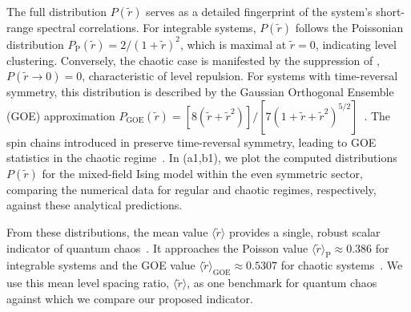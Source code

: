 \documentclass[letterpaper,superscriptaddress,aps,pra,nolongbibliography,showpacs,floatfix,dvipsnames,10pt,twocolumn]{revtex4-2}
\begin{document}
The full distribution $P(\tilde{r})$ serves as a detailed
fingerprint of the system's short-range spectral correlations.
For integrable systems, $P(\tilde{r})$ follows the Poissonian
distribution $P_{\text{P}}(\tilde{r}) = 2 / (1 + \tilde{r})^2$,
which is maximal at $\tilde{r}=0$, indicating level clustering.
Conversely, the chaotic case is manifested by the suppression of ,
$P(\tilde{r} \to 0) = 0$, characteristic of level
repulsion. For systems with time-reversal symmetry, this
distribution is described by the 
Gaussian Orthogonal Ensemble (GOE) approximation $P_{\text{GOE}}(\tilde{r}) =
[8(\tilde{r} + \tilde{r}^2)] / [7(1 + \tilde{r} + \tilde{r}^2)^{5/2}]$~\cite{atas_2013_distribution}. 
The spin chains introduced in  preserve time-reversal symmetry, leading to GOE statistics in the chaotic regime~\cite{haake_2001_quantum}.
In (a1,b1),
we plot the computed distributions $P(\tilde{r})$ for the
mixed-field Ising model within the even symmetric sector, 
comparing the numerical data for regular and chaotic regimes, respectively, 
against these analytical predictions.

From these distributions, the mean value $\langle \tilde{r} \rangle$
provides a single, robust scalar indicator of quantum 
chaos~\cite{oganesyan_2007_localization,luitz_2015_manybody}. 
It approaches the
Poisson value $\langle \tilde{r} \rangle_{\text{P}} \approx 0.386$
for integrable systems and the GOE value
$\langle \tilde{r} \rangle_{\text{GOE}} \approx 0.5307$ for chaotic
systems~\cite{atas_2013_distribution}. We use this mean level
spacing ratio, $\langle \tilde{r} \rangle$, as one
benchmark for quantum chaos against which we compare our proposed
indicator.
\end{document}
